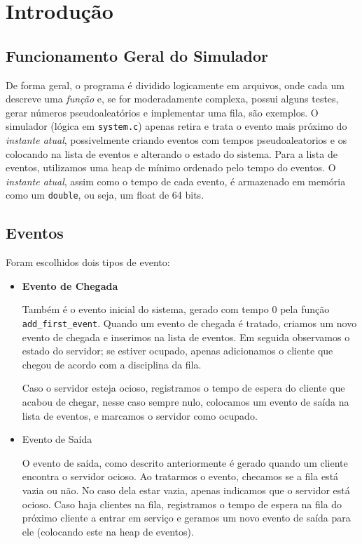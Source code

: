 \documentclass[a4paper]{article}
\newcommand{\arq}{\texttt}
\newcommand{\inlcode}{\texttt}
\begin{document}
\section{Introdução}
\subsection{Funcionamento Geral do Simulador}
De forma geral,
o programa é dividido logicamente em arquivos,
onde cada um descreve uma \emph{função}
e, se for moderadamente complexa, possui alguns testes,
gerar números pseudoaleatórios e implementar uma fila,
são exemplos.
O simulador (lógica em \arq{system.c})
apenas retira e trata o evento mais próximo do \emph{instante atual},
possivelmente criando eventos com tempos pseudoaleatorios
e os colocando na lista de eventos e alterando o estado do sistema.
Para a lista de eventos,
utilizamos uma heap de mínimo ordenado pelo tempo do eventos.
O \emph{instante atual}, assim como o tempo de cada evento,
é armazenado em memória como um \inlcode{double}, ou seja,
um float de 64 bits.

\subsection{Eventos}
Foram escolhidos dois tipos de evento:
\begin{itemize}
    \item \textbf{Evento de Chegada}

        Também é o evento inicial do sistema,
        gerado com tempo \(0\)
        pela função \inlcode{add\_first\_event}.
        Quando um evento de chegada é tratado,
        criamos um novo evento de chegada
        e inserimos na lista de eventos.
        Em seguida observamos o estado do servidor;
        se estiver ocupado, apenas
        adicionamos o cliente que chegou
        de acordo com a disciplina da fila.

        Caso o servidor esteja ocioso,
        registramos o tempo de espera
        do cliente que acabou de chegar,
        nesse caso sempre nulo,
        colocamos um evento de saída na lista de eventos,
        e marcamos o servidor como ocupado.

    \item Evento de Saída

        O evento de saída,
        como descrito anteriormente é gerado quando um cliente encontra o servidor ocioso. Ao tratarmos o evento, checamos se a fila está vazia ou não. No caso dela estar vazia, apenas indicamos que o servidor está ocioso. Caso haja clientes na fila, registramos o tempo de espera na fila do próximo cliente a entrar em serviço e geramos um novo evento de saída para ele (colocando este na heap de eventos).
\end{itemize}
\end{document}
